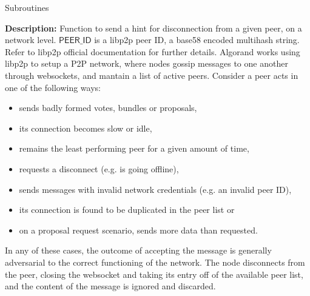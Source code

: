 \documentclass[10pt,a4paper]{article}
\begin{document}
\begin{section}{Subroutines}


\noindent \textbf{Description:}
Function to send a hint for disconnection from a given peer, on a network level.
$\mathsf{PEER\_ID}$ is a libp2p peer ID, a base58 encoded multihash string.
Refer to libp2p official documentation for further details.
Algorand works using libp2p to setup a P2P network, where nodes gossip messages to one another
through websockets, and mantain a list of active peers.
Consider a peer acts in one of the following ways:
\begin{itemize}
    \item sends badly formed votes, bundles or proposals, %
    \item its connection becomes slow or idle,
    \item remains the least performing peer for a given amount of time,
    \item requests a disconnect (e.g. is going offline),
    \item sends messages with invalid network credentials (e.g. an invalid peer ID),
    \item its connection is found to be duplicated in the peer list or
    \item on a proposal request scenario, sends more data than requested.
\end{itemize}
 
In any of these cases, the outcome of accepting the message is generally adversarial
to the correct functioning of the network. The node disconnects from the peer, closing the websocket and taking
its entry off of the available peer list, and the content of the message is ignored and discarded.


\end{section}
\end{document}
